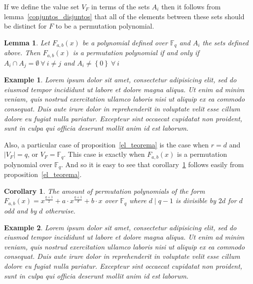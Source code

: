 \documentclass[landscape,final,paperwidth=48in,paperheight=38in]{baposter}
\newtheorem{corollary}{Corollary}
\newtheorem{example}{Example}
\newtheorem{lemma}{Lemma}
\begin{document}
\begin{poster}
{\begin{multicols}{2}
    If we define the value set $V_{F}$ in terms of the sets $A_i$ then it follows from lemma~\ref{conjuntos_disjuntos} that all of the elements between these sets should be distinct for $F$ to be a permutation polynomial.

    \begin{lemma}\label{PP_disjuntos}
      Let $F_{a,b}(x)$ be a polynomial defined over $\mathbb{F}_{q}$ and $A_i$ the sets defined above. Then $F_{a,b}(x)$ is a permutation polynomial if and only if $A_i \cap A_j = \emptyset \ \forall\ i \neq j$ and $A_i \neq \left\{ 0 \right\} \ \forall \ i$
    \end{lemma}

    \begin{example}
      Lorem ipsum dolor sit amet, consectetur adipisicing elit, sed do eiusmod
      tempor incididunt ut labore et dolore magna aliqua. Ut enim ad minim veniam,
      quis nostrud exercitation ullamco laboris nisi ut aliquip ex ea commodo
      consequat. Duis aute irure dolor in reprehenderit in voluptate velit esse
      cillum dolore eu fugiat nulla pariatur. Excepteur sint occaecat cupidatat non
      proident, sunt in culpa qui officia deserunt mollit anim id est laborum.
    \end{example}

    Also, a particular case of proposition~\ref{el_teorema} is the case when $r=d$ and $\left\vert V_{F} \right\vert = q$, or $V_{F} = \mathbb{F}_{q}$. This case is exactly when $F_{a,b}(x)$ is a permutation polynomial over $\mathbb{F}_{q}$. And so it is easy to see that corollary~\ref{cantidad_pp} follows easily from proposition~\ref{el_teorema}.

    \begin{corollary}\label{cantidad_pp}
      The amount of permutation polynomials of the form $F_{a,b}(x) = x^{\frac{q+1}{2}} + a\cdot x^{\frac{q+1}{d}} + b\cdot x$ over $\mathbb{F}_{q}$ where $d \mid q-1$ is divisible by $2d$ for $d$ odd and by $d$ otherwise.
    \end{corollary}

    \begin{example}
      Lorem ipsum dolor sit amet, consectetur adipisicing elit, sed do eiusmod
      tempor incididunt ut labore et dolore magna aliqua. Ut enim ad minim veniam,
      quis nostrud exercitation ullamco laboris nisi ut aliquip ex ea commodo
      consequat. Duis aute irure dolor in reprehenderit in voluptate velit esse
      cillum dolore eu fugiat nulla pariatur. Excepteur sint occaecat cupidatat non
      proident, sunt in culpa qui officia deserunt mollit anim id est laborum.
    \end{example}


\end{multicols}}
\end{poster}
\end{document}
